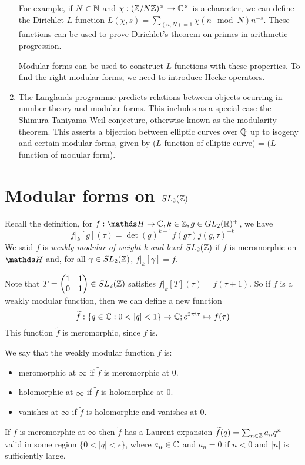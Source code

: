 \documentclass[10pt,a4paper]{article}
\begin{document}
\begin{enumerate}
  For example, if $N \in \mathbb{N}$ and $\chi: (\mathbb{Z}/N\mathbb{Z})^\times \to \mathbb{C}^\times$ is a character, we can define the Dirichlet $L$-function $L(\chi, s) = \sum_{(n,N)=1} \chi(n \mod N)n^{-s}$. These functions can be used to prove Dirichlet's theorem on primes in arithmetic progression.

  Modular forms can be used to construct $L$-functions with these properties. To find the right modular forms, we need to introduce Hecke operators.

  \item The Langlands programme predicts relations between objects ocurring in number theory and modular forms. This includes as a special case the Shimura-Taniyama-Weil conjecture, otherwise known as the modularity theorem. This asserts a bijection between elliptic curves over $\mathbb{Q}$ up to isogeny and certain modular forms, given by ($L$-function of elliptic curve) = ($L$-function of modular form).
\end{enumerate}
\section{Modular forms on $SL_2(\mathbb{Z})$}
Recall the definition, for $f:\H \to \C, k \in \Z, g \in GL_2(\R)^+$, we have
\[f|_k[g](\tau) = \det(g)^{k-1}f(g\tau)j(g,\tau)^{-k}\]
We said $f$ is \emph{weakly modular of weight k and level $SL_2(\mathbb{Z})$} if $f$ is meromorphic on $\H$ and, for all $\gamma \in SL_2(\mathbb{Z})$, $f|_k[\gamma] = f$.

Note that $T = \begin{pmatrix}1&1\\0&1 \end{pmatrix} \in SL_2(\mathbb{Z})$ satisfies $f|_k[T](\tau) = f(\tau+1)$. So if $f$ is a weakly modular function, then we can define a new function
\[\tilde{f}:\{q \in \C: 0<|q|<1\} \to \C; e^{2\pi\im\tau} \mapsto f(\tau)\]
This function $\tilde{f}$ is meromorphic, since $f$ is.
\begin{definition}
  We say that the weakly modular function $f$ is:
  \begin{itemize}
    \item meromorphic at $\infty$ if $\tilde{f}$ is meromorphic at 0.
    \item holomorphic at $\infty$ if $\tilde{f}$ is holomorphic at 0.
    \item vanishes at $\infty$ if $\tilde{f}$ is holomorphic and vanishes at 0.
  \end{itemize}
\end{definition}
If $f$ is meromorphic at $\infty$ then $\tilde{f}$ has a Laurent expansion $\widetilde{f}(q) = \sum_{n \in \mathbb{Z}}a_nq^n$ valid in some region $\{0 <|q|< \epsilon\}$, where $a_n \in \mathbb{C}$ and $a_n = 0$ if $n<0$ and $|n|$ is sufficiently large.
\end{document}
